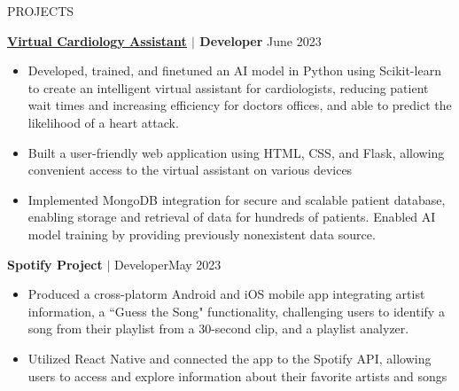 \documentclass{resume} %
\begin{document}
\vspace{-0.4em}
\begin{rSection}{PROJECTS}

{\textbf{\href{https://github.com/eden-chung/CardiologistAssistant}{\underline{Virtual Cardiology Assistant}} $\vert$ Developer}} \hfill June 2023 \\
\vspace{-1.5em}
\begin{itemize}
\item Developed, trained, and finetuned an AI model in Python using Scikit-learn to create an intelligent virtual assistant for cardiologists, reducing patient wait times and increasing efficiency for doctors offices, and able to predict the likelihood of a heart attack.
\vspace{-0.4em}
\item Built a user-friendly web application using HTML, CSS, and Flask, allowing convenient access to the virtual assistant on various devices
\vspace{-0.4em}
\item Implemented MongoDB integration for secure and scalable patient database, enabling storage and retrieval of data for hundreds of patients. Enabled AI model training by providing previously nonexistent data source.
\end{itemize}

\vspace{-0.25em}

{\textbf{Spotify Project} $\vert$ Developer}\hfill May 2023 \\
\vspace{-1.5em}
\begin{itemize}
\item Produced a cross-platorm Android and iOS mobile app integrating artist information, a ``Guess the Song" functionality, challenging users to identify a song from their playlist from a 30-second clip, and a playlist analyzer.
\vspace{-0.4em}
\item Utilized React Native and connected the app to the Spotify API, allowing users to access and explore information about their favorite artists and songs
\end{itemize}
\vspace{-0.25em}



\end{rSection}
\end{document}
